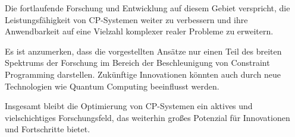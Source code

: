 Die fortlaufende Forschung und Entwicklung auf diesem Gebiet verspricht, die
Leistungsfähigkeit von CP-Systemen weiter zu verbessern und ihre Anwendbarkeit
auf eine Vielzahl komplexer realer Probleme zu erweitern.

Es ist anzumerken, dass die vorgestellten Ansätze nur einen Teil des breiten
Spektrums der Forschung im Bereich der Beschleunigung von Constraint Programming
darstellen. Zukünftige Innovationen könnten auch durch neue Technologien wie
Quantum Computing beeinflusst werden.

Insgesamt bleibt die Optimierung von CP-Systemen ein aktives und vielschichtiges
Forschungsfeld, das weiterhin großes Potenzial für Innovationen und Fortschritte
bietet.


\printbibliography[heading=bibintoc]





